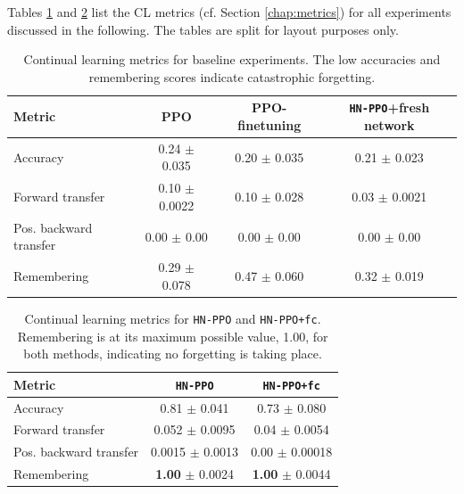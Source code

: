 \documentclass[dvipsnames]{article} %
\newcommand{\commentOLD}[1]{}
\newcommand{\jhOLD}[1] {\commentOLD{{\color{RawSienna} JH: #1}}}           %
\begin{document}
Tables \ref{tab:cl-metrics-baselines} and \ref{tab:cl-metrics-cl} list the CL metrics (cf. Section \ref{chap:metrics}) for all experiments discussed in the following. The tables are split for layout purposes only. 

\begin{table}[tb]
\caption{Continual learning metrics for baseline experiments. The low accuracies and remembering scores indicate catastrophic forgetting. \jhOLD{What do you think about booktabs style like this?}}
\label{tab:cl-metrics-baselines}
\begin{center}
\begin{tabular}{@{}lccc@{}}
\toprule
Metric & PPO & PPO-finetuning & \texttt{HN-PPO}+fresh network \\
\midrule
Accuracy               & 0.24 $\pm$ 0.035 & 0.20 $\pm$ 0.035 & 0.21 $\pm$ 0.023 \\
Forward transfer       & 0.10 $\pm$ 0.0022& 0.10 $\pm$ 0.028 & 0.03 $\pm$ 0.0021 \\
Pos. backward transfer & 0.00 $\pm$ 0.00  & 0.00 $\pm$ 0.00  & 0.00 $\pm$ 0.00 \\
Remembering            & 0.29 $\pm$ 0.078 & 0.47 $\pm$ 0.060 & 0.32 $\pm$ 0.019 \\
\bottomrule
\end{tabular}
\end{center}
\end{table}

\begin{table}[tb]
\caption{Continual learning metrics for \texttt{HN-PPO} and \texttt{HN-PPO+fc}. Remembering is at its maximum possible value, 1.00, for both methods, indicating no forgetting is taking place.}
\label{tab:cl-metrics-cl}
\begin{center}
\begin{tabular}{@{}lcc@{}}
\toprule
Metric & \texttt{HN-PPO} & \texttt{HN-PPO+fc} \\ 
\midrule
Accuracy               &  0.81 $\pm$ 0.041 & 0.73 $\pm$ 0.080\\
Forward transfer       &  0.052 $\pm$ 0.0095 & 0.04 $\pm$ 0.0054\\
Pos. backward transfer &  0.0015 $\pm$ 0.0013 & 0.00 $\pm$ 0.00018\\
Remembering            &  \textbf{1.00} $\pm$ 0.0024 & \textbf{1.00} $\pm$ 0.0044\\
\bottomrule
\end{tabular}
\end{center}
\end{table}
\end{document}
